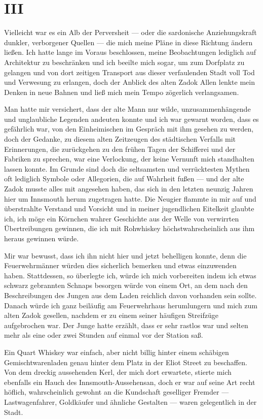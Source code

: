 \chapter*{III}

Vielleicht war es ein Alb der Perversheit --- oder die sardonische Anziehungskraft dunkler, verborgener Quellen --- die mich meine Pläne in diese Richtung ändern ließen. Ich hatte lange im Voraus beschlossen, meine Beobachtungen lediglich auf Architektur zu beschränken und ich beeilte mich sogar, um zum Dorfplatz zu gelangen und von dort zeitigen Transport aus dieser verfaulenden Stadt voll Tod und Verwesung zu erlangen, doch der Anblick des alten Zadok Allen lenkte mein Denken in neue Bahnen und ließ mich mein Tempo zögerlich verlangsamen.

Man hatte mir versichert, dass der alte Mann nur wilde, unzusammenhängende und unglaubliche Legenden andeuten konnte und ich war gewarnt worden, dass es gefährlich war, von den Einheimischen im Gespräch mit ihm gesehen zu werden, doch der Gedanke, zu diesem alten Zeitzeugen des städtischen Verfalls mit Erinnerungen, die zurückgehen zu den frühen Tagen der Schifferei und der Fabriken zu sprechen, war eine Verlockung, der keine Vernunft mich standhalten lassen konnte. Im Grunde sind doch die seltsamsten und verrücktesten Mythen oft lediglich Symbole oder Allegorien, die auf Wahrheit fußen --- und der alte Zadok musste alles mit angesehen haben, das sich in den letzten neunzig Jahren hier um Innsmouth herum zugetragen hatte. Die Neugier flammte in mir auf und überstrahlte Verstand und Vorsicht und in meiner jugendlichen Eitelkeit glaubte ich, ich möge ein Körnchen wahrer Geschichte aus der Welle von verwirrten Übertreibungen gewinnen, die ich mit Rohwhiskey höchstwahrscheinlich aus ihm heraus gewinnen würde.

Mir war bewusst, dass ich ihn nicht hier und jetzt behelligen konnte, denn die Feuerwehrmänner würden dies sicherlich bemerken und etwas einzuwenden haben. Stattdessen, so überlegte ich, würde ich mich vorbereiten indem ich etwas schwarz gebrannten Schnaps besorgen würde von einem Ort, an dem nach den Beschreibungen des Jungen aus dem Laden reichlich davon vorhanden sein sollte. Danach würde ich ganz beiläufig am Feuerwehrhaus herumlungern und mich zum alten Zadok gesellen, nachdem er zu einem seiner häufigen Streifzüge aufgebrochen war. Der Junge hatte erzählt, dass er sehr rastlos war und selten mehr als eine oder zwei Stunden auf einmal vor der Station saß.

Ein Quart Whiskey war einfach, aber nicht billig hinter einem schäbigen Gemischtwarenladen genau hinter dem Platz in der Eliot Street zu beschaffen. Von dem dreckig aussehenden Kerl, der mich dort erwartete, stierte mich ebenfalls ein Hauch des \glqq Innsmouth-Aussehens\grqq an, doch er war auf seine Art recht höflich, wahrscheinlich gewohnt an die Kundschaft geselliger Fremder --- Lastwagenfahrer, Goldkäufer und ähnliche Gestalten --- waren gelegentlich in der Stadt.

